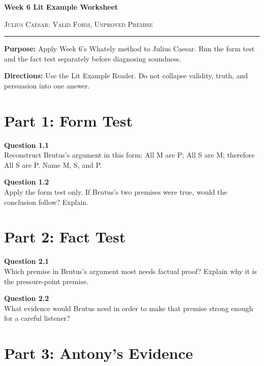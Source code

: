 \documentclass[12pt]{article}
\begin{document}
\begin{center}
{\LARGE\bfseries Week 6 Lit Example Worksheet}\par\vspace{0.05em}
{\large\scshape Julius Caesar: Valid Form, Unproved Premise}\par\vspace{0.12em}
\rule{0.78\textwidth}{0.5pt}
\end{center}

\textbf{Purpose:} Apply Week 6's Whately method to Julius Caesar. Run the form test and the fact test separately before diagnosing soundness.

\textbf{Directions:} Use the Lit Example Reader. Do not collapse validity, truth, and persuasion into one answer.

\section*{Part 1: Form Test}

\textbf{Question 1.1}\\[-0.15em]
Reconstruct Brutus's argument in this form: All M are P; All S are M; therefore All S are P. Name M, S, and P.


\textbf{Question 1.2}\\[-0.15em]
Apply the form test only. If Brutus's two premises were true, would the conclusion follow? Explain.


\newpage

\section*{Part 2: Fact Test}

\textbf{Question 2.1}\\[-0.15em]
Which premise in Brutus's argument most needs factual proof? Explain why it is the pressure-point premise.


\textbf{Question 2.2}\\[-0.15em]
What evidence would Brutus need in order to make that premise strong enough for a careful listener?


\newpage

\section*{Part 3: Antony's Evidence}
\end{document}
